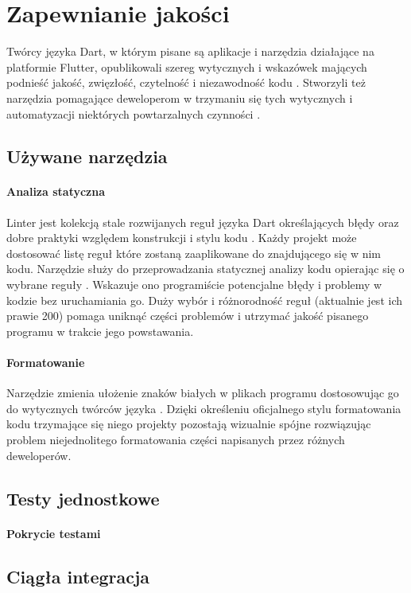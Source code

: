 \section{Zapewnianie jakości}
Twórcy języka Dart, w którym pisane są aplikacje i narzędzia działające na platformie Flutter, opublikowali szereg wytycznych i wskazówek mających podnieść jakość, zwięzłość, czytelność i niezawodność kodu \cite{Effective_Dart}. Stworzyli też narzędzia pomagające deweloperom w trzymaniu się tych wytycznych i automatyzacji niektórych powtarzalnych czynności \cite{Dart_SDK}.

\subsection{Używane narzędzia}

\paragraph{Analiza statyczna}
Linter jest kolekcją stale rozwijanych reguł języka Dart określających błędy oraz dobre praktyki względem konstrukcji i stylu kodu \cite{Dart_Lints}. Każdy projekt  może dostosować listę reguł które zostaną zaaplikowane do znajdującego się w nim kodu. Narzędzie  służy do przeprowadzania statycznej analizy kodu opierając się o wybrane reguły \cite{Dart_Analyze}. Wskazuje ono programiście potencjalne błędy i problemy w kodzie bez uruchamiania go. Duży wybór i różnorodność reguł (aktualnie jest ich prawie 200) pomaga uniknąć części problemów i utrzymać jakość pisanego programu w trakcie jego powstawania.

\paragraph{Formatowanie}
Narzędzie  zmienia ułożenie znaków białych w plikach programu dostosowując go do wytycznych twórców języka \cite{Dart_Format}. Dzięki określeniu oficjalnego stylu formatowania kodu trzymające się niego projekty pozostają wizualnie spójne rozwiązując problem niejednolitego formatowania części napisanych przez różnych deweloperów.

\subsection{Testy jednostkowe}


\paragraph{Pokrycie testami}

\bigskip
{}

\subsection{Ciągła integracja}

